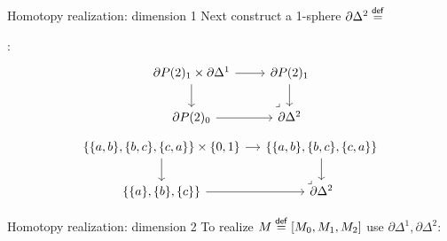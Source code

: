 \documentclass[14pt,aspectratio=169]{beamer}
\begin{document}
\begin{frame}{Homotopy realization: dimension 1}
Next construct a 1-sphere \( \partial\Delta^2\stackrel{\mathsf{def}}{=} \)
:
\[%
\begin{tikzcd}[ampersand replacement=\&]
  {\partial P(2)_1\times \partial\Delta^1} \& {\partial P(2)_1} \\
  {\partial P(2)_0} \& {\partial\Delta^2}
  \arrow[from=1-1, to=1-2]
  \arrow[from=1-1, to=2-1]
  \arrow[from=1-2, to=2-2]
  \arrow[from=2-1, to=2-2]
  \arrow["\ulcorner"{pos=-0, rotate=180}, draw=none, from=2-2, to=1-1]
\end{tikzcd}\]
\[%
\begin{tikzcd}[ampersand replacement=\&, column sep=small]
  {\{\{a, b\}, \{b, c\}, \{c, a\}\}\times \{0, 1\}} \& {\{\{a, b\}, \{b, c\}, \{c, a\}\}} \\
  {\{\{a\}, \{b\}, \{c\}\}} \& {\partial\Delta^2}
  \arrow[from=1-1, to=1-2]
  \arrow[from=1-1, to=2-1]
  \arrow[from=1-2, to=2-2]
  \arrow[from=2-1, to=2-2]
  \arrow["\ulcorner"{pos=-0, rotate=180}, draw=none, from=2-2, to=1-1]
\end{tikzcd}\]
\end{frame}

\begin{frame}{Homotopy realization: dimension 2}
To realize \( M\stackrel{\mathsf{def}}{=}[M_0, M_1, M_2] \) use \(  \partial\Delta^1, \partial\Delta^2 \):
\[\]
\end{frame}
\end{document}
